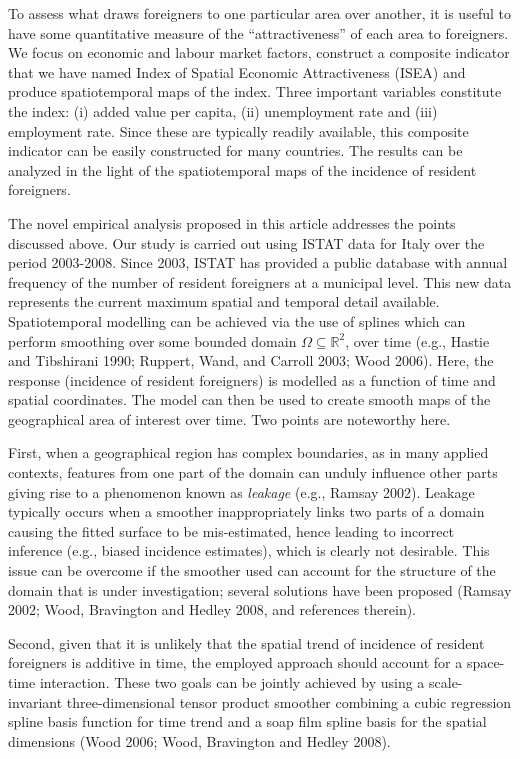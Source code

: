 \documentclass[10pt] {article}
\theoremstyle{definition}
\theoremstyle{plain}
\begin{document}
To assess what draws foreigners to one particular area over another, it is useful to have some quantitative measure of the ``attractiveness'' of each area to foreigners. We focus on economic and labour market factors, construct a composite indicator that we have named Index of Spatial Economic Attractiveness (ISEA) and produce spatiotemporal maps of the index. Three important variables constitute the index: (i) added value per capita, (ii) unemployment rate and (iii) employment rate. Since these are typically readily available, this composite indicator can be easily constructed for many countries. The results can be analyzed in the light of the spatiotemporal maps of the incidence of resident foreigners.

The novel empirical analysis proposed in this article addresses the points discussed above. Our study is carried out using ISTAT data for Italy over the period 2003-2008. Since 2003, ISTAT has provided a public database with annual frequency of the number of resident foreigners at a municipal level. This new data represents the current maximum spatial and temporal detail available. Spatiotemporal modelling can be achieved via the use of splines which can perform smoothing over some bounded domain $\Omega\subseteq\mathbb{R}^2$, over time (e.g., Hastie and Tibshirani 1990; Ruppert, Wand, and Carroll 2003; Wood 2006). Here, the response (incidence of resident foreigners) is modelled as a function of time and spatial coordinates. The model can then be used to create smooth maps of the geographical area of interest over time. Two points are noteworthy here. 

First, when a geographical region has complex boundaries, as in many applied contexts, features from one part of the domain can unduly influence other parts giving rise to a phenomenon known as \textit{leakage} (e.g., Ramsay 2002). Leakage typically occurs when a smoother inappropriately links two parts of a domain causing the fitted surface to be mis-estimated, hence leading to incorrect inference (e.g., biased incidence estimates), which is clearly not desirable. This issue can be overcome if the smoother used can account for the structure of the domain that is under investigation; several solutions have been proposed (Ramsay 2002; Wood, Bravington and Hedley 2008, and references therein). 

Second, given that it is unlikely that the spatial trend of incidence of resident foreigners is additive in time, the employed approach should account for a space-time interaction. These two goals can be jointly achieved by using a scale-invariant three-dimensional tensor product smoother combining a cubic regression spline basis function for time trend and a soap film spline basis for the spatial dimensions (Wood 2006; Wood, Bravington and Hedley 2008).
\end{document}
